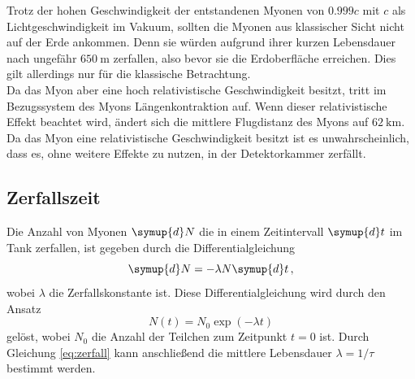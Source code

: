 Trotz der hohen Geschwindigkeit der entstandenen Myonen von $0.999c$ mit $c$ als Lichtgeschwindigkeit im Vakuum, sollten die Myonen aus klassischer Sicht nicht auf der Erde ankommen.
Denn sie würden aufgrund ihrer kurzen Lebensdauer nach ungefähr $\SI{650}{\meter}$ zerfallen, also bevor sie die Erdoberfläche erreichen.
Dies gilt allerdings nur für die klassische Betrachtung.\\
Da das Myon aber eine hoch relativistische Geschwindigkeit besitzt, tritt im Bezugssystem des Myons Längenkontraktion auf.
Wenn dieser relativistische Effekt beachtet wird, ändert sich die mittlere Flugdistanz des Myons auf $\SI{62}{\kilo\meter}$. \\
Da das Myon eine relativistische Geschwindigkeit besitzt ist es unwahrscheinlich, dass es, ohne weitere Effekte zu nutzen, in der Detektorkammer zerfällt.
\subsection{Zerfallszeit}
Die Anzahl von Myonen $\symup{d}N$ die in einem Zeitintervall $\symup{d}t$ im Tank zerfallen, ist gegeben durch die Differentialgleichung
\begin{equation*}
    \symup{d}N = -\lambda N \symup{d}t\, ,
\end{equation*}
wobei $\lambda$ die Zerfallskonstante ist.
Diese Differentialgleichung wird durch den Ansatz 
\begin{equation}
    N(t) = N_0 \exp(-\lambda t)
    \label{eq:zerfall}
\end{equation}
gelöst, wobei $N_0$ die Anzahl der Teilchen zum Zeitpunkt $t=0$ ist.
Durch Gleichung \eqref{eq:zerfall} kann anschließend die mittlere Lebensdauer $\lambda = 1/\tau$ bestimmt werden.
